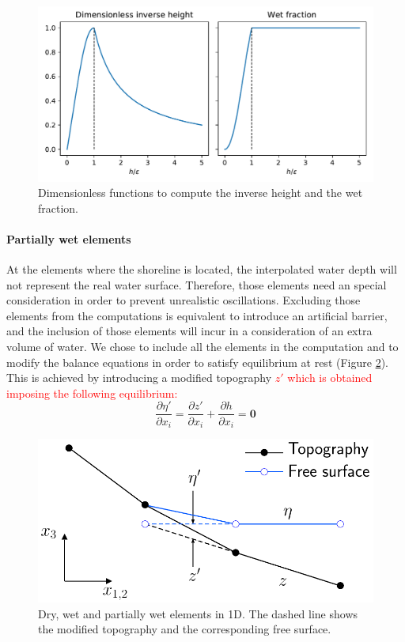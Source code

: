 \documentclass[a4paper,12pt]{elsarticle}
\newcommand{\Miguel}[1]{\textcolor{red}{#1}}
\newcommand{\pder}[2]{\frac{\partial#1}{\partial#2}}
\begin{document}
\begin{figure}
    \centering
    \includegraphics[width=\textwidth]{img/fig/inverse_height.pdf}
    \caption{Dimensionless functions to compute the  inverse height and the wet fraction.}
    \label{inverse_heihgt}
\end{figure}


\paragraph{Partially wet elements}
At the elements where the shoreline is located, the interpolated water depth will not represent the real water surface.
Therefore, those elements need an special consideration in order to prevent unrealistic oscillations. Excluding those elements from the computations is equivalent to introduce an artificial barrier, and the inclusion of those elements will incur in a consideration of an extra volume of water.
We chose to include all the elements in the computation and to modify the balance equations in order to satisfy equilibrium at rest (Figure \ref{partially_dry}). This is achieved by introducing a modified topography
\Miguel{$z'$ which is obtained imposing the following equilibrium:}
\begin{equation}
    \pder{\eta'}{x_i} = \pder{z'}{x_i} + \pder{h}{x_i} = \mathbf{0}
\end{equation}

\begin{figure}
    \centering
    \includegraphics[width=.5\textwidth]{img/fig/partially_dry.pdf}
    \caption{Dry, wet and partially wet elements in 1D. The dashed line shows the modified topography  and the corresponding free surface.}
    \label{partially_dry}
\end{figure}
\end{document}
